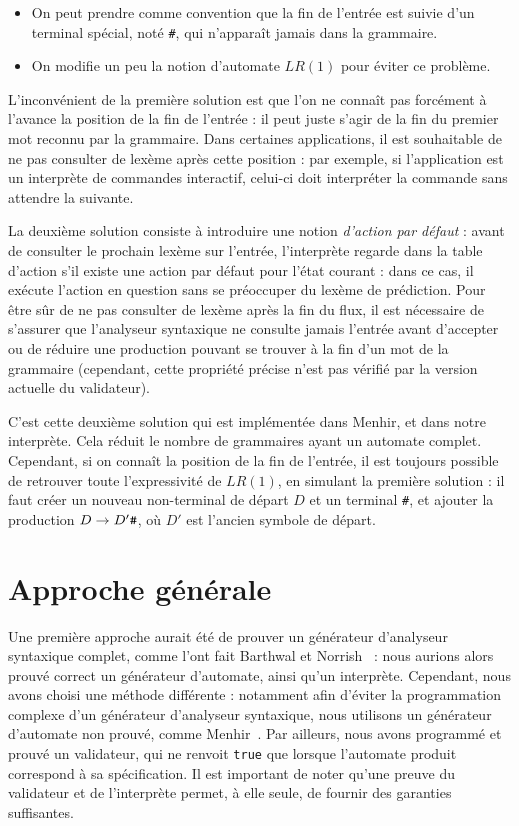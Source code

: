 \documentclass[a4paper,11pt]{article}
\begin{document}
\begin{itemize}
  \item On peut prendre comme convention que la fin de l'entrée est
    suivie d'un terminal spécial, noté \verb+#+, qui n'apparaît jamais
    dans la grammaire.
  \item On modifie un peu la notion d'automate $LR(1)$ pour éviter ce
    problème.
\end{itemize}

L'inconvénient de la première solution est que l'on ne connaît pas
forcément à l'avance la position de la fin de l'entrée : il peut juste
s'agir de la fin du premier mot reconnu par la grammaire. Dans
certaines applications, il est souhaitable de ne pas consulter de
lexème après cette position : par exemple, si l'application est un
interprète de commandes interactif, celui-ci doit interpréter la
commande sans attendre la suivante.

La deuxième solution consiste à introduire une notion \emph{d'action
 par défaut} : avant de consulter le prochain lexème sur l'entrée,
l'interprète regarde dans la table d'action s'il existe une action par
défaut pour l'état courant : dans ce cas, il exécute l'action en
question sans se préoccuper du lexème de prédiction. Pour être sûr de
ne pas consulter de lexème après la fin du flux, il est nécessaire de
s'assurer que l'analyseur syntaxique ne consulte jamais l'entrée avant
d'accepter ou de réduire une production pouvant se trouver à la fin
d'un mot de la grammaire (cependant, cette propriété précise n'est pas
vérifié par la version actuelle du validateur).

C'est cette deuxième solution qui est implémentée dans Menhir, et dans
notre interprète. Cela réduit le nombre de grammaires ayant un
automate complet. Cependant, si on connaît la position de la fin de
l'entrée, il est toujours possible de retrouver toute l'expressivité
de $LR(1)$, en simulant la première solution : il faut créer un
nouveau non-terminal de départ $D$ et un terminal \verb+#+, et ajouter
la production $D \rightarrow D'\verb+#+$, où $D'$ est l'ancien symbole
de départ.

\section{Approche générale}

Une première approche aurait été de prouver un générateur d'analyseur
syntaxique complet, comme l'ont fait Barthwal et
Norrish~\cite{barthwal} : nous aurions alors prouvé correct un
générateur d'automate, ainsi qu'un interprète. Cependant, nous avons
choisi une méthode différente : notamment afin d'éviter la
programmation complexe d'un générateur d'analyseur syntaxique, nous
utilisons un générateur d'automate non prouvé, comme
Menhir~\cite{menhir}. Par ailleurs, nous avons programmé et prouvé un
validateur, qui ne renvoit \verb+true+ que lorsque l'automate produit
correspond à sa spécification. Il est important de noter qu'une preuve
du validateur et de l'interprète permet, à elle seule, de fournir des
garanties suffisantes.
\end{document}
